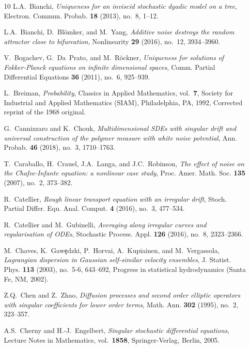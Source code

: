\documentclass[a4paper,10pt]{article}
\newcommand\1{\mathbbm{1}}
\numberwithin{equation}{section}
\begin{document}
\begin{thebibliography}{10}
L.A.~Bianchi, \emph{Uniqueness for an inviscid stochastic dyadic model on a
  tree}, Electron. Commun. Probab. \textbf{18} (2013), no.~8, 1--12.

L.A.~Bianchi, D.~Bl\"omker, and M.~Yang, \emph{Additive noise destroys the random attractor close to bifurcation}, Nonlinearity \textbf{29} (2016), no.~12, 3934--3960.  
  
V.~Bogachev, G.~Da~Prato, and M.~R\"{o}ckner, \emph{Uniqueness for solutions of {F}okker-{P}lanck equations on infinite dimensional spaces}, Comm. Partial Differential Equations \textbf{36} (2011), no.~6, 925--939.

L.~Breiman, \emph{Probability}, Classics in Applied Mathematics, vol.~\textbf{7}, Society for Industrial and Applied Mathematics (SIAM), Philadelphia, PA, 1992, Corrected reprint of the 1968 original.

G.~Cannizzaro and K.~Chouk, \emph{Multidimensional {SDE}s with singular drift and universal construction of the polymer measure with white noise
  potential}, Ann. Probab. \textbf{46} (2018), no.~3, 1710--1763.

T.~Caraballo, H.~Crauel, J.A.~Langa, and J.C.~Robinson, \emph{The effect of noise on the Chafee-Infante equation: a nonlinear case study}, Proc. Amer. Math. Soc. \textbf{135} (2007), no.~2, 373--382.  
  
R.~Catellier, \emph{Rough linear transport equation with an irregular drift}, Stoch. Partial Differ. Equ. Anal. Comput. \textbf{4} (2016), no.~3, 477--534.

R.~Catellier and M.~Gubinelli, \emph{Averaging along irregular curves and
  regularisation of {ODE}s}, Stochastic Process. Appl. \textbf{126}
  (2016), no.~8, 2323--2366.

M.~Chaves, K.~Gaw\c{e}dzki, P.~Horvai, A.~Kupiainen, and M.~Vergassola,
  \emph{Lagrangian dispersion in {G}aussian self-similar velocity ensembles}, J. Statist. Phys. \textbf{113} (2003), no.~5-6, 643--692, Progress in statistical hydrodynamics (Santa Fe, NM, 2002).

Z.Q.~Chen and Z.~Zhao, \emph{Diffusion processes and second order elliptic
  operators with singular coefficients for lower order terms}, Math. Ann.
  \textbf{302} (1995), no.~2, 323--357.

A.S.~Cherny and H.-J.~Engelbert, \emph{Singular stochastic differential
  equations}, Lecture Notes in Mathematics, vol.~\textbf{1858}, Springer-Verlag,
  Berlin, 2005.


\end{thebibliography}
\end{document}
